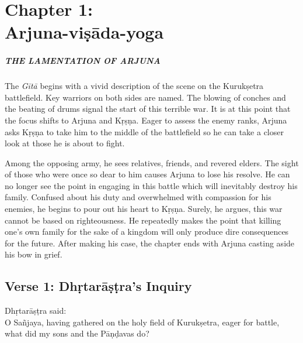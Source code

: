 \chapter{Chapter 1: \\Arjuna-viṣāda-yoga}\label{chap-arjuna-visada-yoga}

\paragraph*{\MakeUppercase{The Lamentation of Arjuna}}

\noindent The \textit{Gītā} begins with a vivid description of the scene on the Kurukṣetra battlefield. Key warriors on both sides are named. The blowing of conches and the beating of drums signal the start of this terrible war. It is at this point that the focus shifts to Arjuna and Kṛṣṇa. Eager to assess the enemy ranks, Arjuna asks Kṛṣṇa to take him to the middle of the battlefield so he can take a closer look at those he is about to fight.

Among the opposing army, he sees relatives, friends, and revered elders. The sight of those who were once so dear to him causes Arjuna to lose his resolve. He can no longer see the point in engaging in this battle which will inevitably destroy his family. Confused about his duty and overwhelmed with compassion for his enemies, he begins to pour out his heart to Kṛṣṇa. Surely, he argues, this war cannot be based on righteousness. He repeatedly makes the point that killing one’s own family for the sake of a kingdom will only produce dire consequences for the future. After making his case, the chapter ends with Arjuna casting aside his bow in grief.

\section{Verse 1: Dhṛtarāṣṭra's Inquiry}\label{sec-verse-1-dhrtarastra-s-inquiry}

{\hspace*{1em}Dhṛtarāṣṭra said: \\
O Sañjaya, having gathered on the holy field of Kurukṣetra, eager for battle, what did my sons and the Pāṇḍavas do?}

